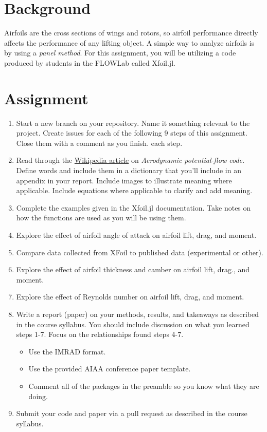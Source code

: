 \documentclass[12pt]{article}
\begin{document}
	
	\section{Background}
	
	Airfoils are the cross sections of wings and rotors, so airfoil performance directly affects the performance of any lifting object.
	A simple way to analyze airfoils is by using a \textit{panel method}. 
	For this assignment, you will be utilizing a code produced by students in the FLOWLab called Xfoil.jl.
	
	
	\section{Assignment}

	\begin{enumerate}
		\item Start a new branch on your repository. Name it something relevant to the project. Create issues for each of the following 9 steps of this assignment. Close them with a comment as you finish. each step. 
		\item Read  through the \href{https://en.wikipedia.org/wiki/Aerodynamic_potential-flow_code}{Wikipedia article} on \textit{Aerodynamic potential-flow code.}  Define words and include them in a dictionary that you'll include in an appendix in your report.  Include images to illustrate meaning where applicable. Include equations where applicable to clarify and add meaning. 
		\item Complete the examples given in the Xfoil.jl documentation. Take notes on how the functions are used as you will be using them. 
		\item Explore the effect of airfoil angle of attack on airfoil lift, drag, and moment.
		\item Compare data collected from XFoil to published data (experimental or other). 
		\item Explore the effect of airfoil thickness and camber on airfoil lift, drag., and moment.
		\item Explore the effect of Reynolds number on airfoil lift, drag, and moment.
		\item Write a report (paper) on your methods, results, and takeaways as described in the course syllabus. You should include discussion on what you learned steps 1-7.  Focus on the relationships found steps 4-7. 
		\begin{itemize}
			\item Use the IMRAD format.
			\item Use the provided AIAA conference paper template.
			\item Comment all of the packages in the preamble so you know what they are doing. 
		\end{itemize}
		\item Submit your code and paper via a pull request as described in the course syllabus.
	\end{enumerate}
	
\end{document}
